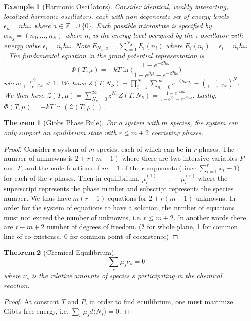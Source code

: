 \documentclass[a4paper]{article}
\newtheorem{eg}{Example}[section]
\newtheorem{thm}{Theorem}[section]
\theoremstyle{new}
\begin{document}
\begin{eg}[Harmonic Oscillators]
Consider identical, weakly interacting, localized harmonic oscillators, each with non-degenerate set of energy levels $\epsilon_n=n\hbar\omega$ where $n\in\mathbb{Z}^+\cup\{0\}$. Each possible microstate is specified by $\alpha_{N_S}=(n_1,...,n_N)$ where $n_i$ is the energy level occupied by the $i$-oscillator with energy value $\epsilon_i=n_i\hbar\omega$. Note $E_{N_S,\alpha}=\sum_{i=1}^{N_S}E_i(n_i)$ where $E_i(n_i)=\epsilon_i=n_i\hbar\omega$. The fundamental equation in the grand potential representation is
$$\Phi(T,\mu)=-kT\ln\bigg(\frac{1-e^{-\beta\hbar\omega}}{1-e^{\beta\mu}-e^{-\beta\hbar\omega}}\bigg)$$
where $\frac{e^{\beta\mu}}{1-e^{-\beta\hbar\omega}}<1$. We have $Z(T,N_S)=\prod_{i=1}^N\sum_{n_i=0}^\infty e^{-\beta\hbar\omega n_i}=(\frac{1}{1-e^{-\beta\hbar\omega}})^N$. We then have $\mathcal{Z}(T,\mu)=\sum_{N_S=0}^\infty z^{N_S}Z(T,N_S)=\frac{1-e^{-\beta\hbar\omega}}{1-e^{\beta\mu}-e^{-\beta\hbar\omega}}$. Lastly,  $\Phi(T,\mu)=-kT\ln(\mathcal{Z}(T,\mu))$.
\end{eg}
\begin{thm}[Gibbs Phase Rule]
For a system with $m$ species, the system can only support an equilibrium state with $r\leq m+2$ coexisting phases.
\end{thm}
\begin{proof}
Consider a system of $m$ species, each of which can be in $r$ phases. The number of unknowns is $2+r(m-1)$ where there are two intensive variables $P$ and $T$, and the mole fractions of $m-1$ of the components (since $\sum_{i=1}^rx_i=1$) for each of the $r$ phases. Then in equilibrium, $\mu_i^{(1)}=...=\mu_i^{(r)}$ where the superscript represents the phase number and subscript represents the species number. We thus have $m(r-1)$ equations for $2+r(m-1)$ unknowns. In order for the system of equations to have a solution, the number of equations must not exceed the number of unknowns, i.e. $r\leq m+2$. In another words there are $r-m+2$ number of degrees of freedom. (2 for whole plane, 1 for common line of co-existence, 0 for common point of coexistence)
\end{proof}
\begin{thm}[Chemical Equilibrium]
$$\sum_s\mu_s\nu_s=0$$
where $\nu_s$ is the relative amounts of species $s$ participating in the chemical reaction.
\end{thm}
\begin{proof}
At constant $T$ and $P$, in order to find equilibrium, one must maximize Gibbs free energy, i.e. $\sum_s\mu_sd\langle N_s\rangle=0$.
\end{proof}
\newpage
\end{document}
